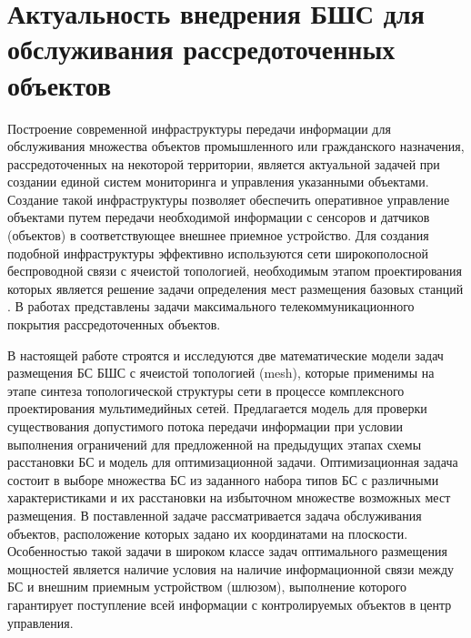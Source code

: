 \section{Актуальность внедрения БШС для обслуживания рассредоточенных объектов}

Построение современной инфраструктуры передачи информации для обслуживания множества объектов промышленного или гражданского назначения, рассредоточенных на некоторой территории, является актуальной задачей при создании единой систем мониторинга и управления указанными объектами.  Создание такой инфраструктуры позволяет обеспечить оперативное управление объектами путем передачи необходимой информации с сенсоров и датчиков (объектов) в соответствующее внешнее приемное устройство. Для создания подобной инфраструктуры эффективно используются сети широкополосной беспроводной связи с ячеистой топологией, необходимым этапом проектирования которых является решение задачи определения мест размещения базовых станций \cite{VishnevskyBook}. В работах \cite{Cicek2019, Medvedeva2020, Khayrov2020} представлены задачи максимального телекоммуникационного покрытия рассредоточенных объектов.


В настоящей работе строятся и исследуются две математические модели задач размещения БС БШС с ячеистой топологией (mesh), которые применимы на этапе синтеза топологической структуры сети в процессе комплексного проектирования мультимедийных сетей. Предлагается модель для проверки существования допустимого потока передачи информации при условии выполнения ограничений для предложенной на предыдущих этапах схемы расстановки БС и модель для оптимизационной задачи. Оптимизационная задача состоит в выборе множества БС из заданного набора типов БС с различными характеристиками и их расстановки на избыточном множестве возможных мест размещения. В поставленной задаче рассматривается задача обслуживания объектов, расположение которых задано их координатами на плоскости. Особенностью такой задачи в широком классе задач оптимального размещения мощностей является наличие условия на наличие информационной связи между БС и внешним приемным устройством (шлюзом), выполнение которого гарантирует поступление всей информации с контролируемых объектов в центр управления. 


